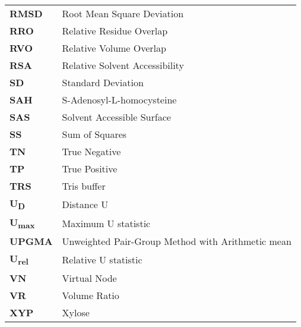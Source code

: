 \begin{longtable}[l]{@{}p{2.5cm}p{12cm}@{}}
\textbf{RMSD} & Root Mean Square Deviation \\
\textbf{RRO} & Relative Residue Overlap \\
\textbf{RVO} & Relative Volume Overlap \\
\textbf{RSA} & Relative Solvent Accessibility \\
\textbf{SD} & Standard Deviation \\
\textbf{SAH} & S-Adenosyl-L-homocysteine \\
\textbf{SAS} & Solvent Accessible Surface \\
\textbf{SS} & Sum of Squares \\
\textbf{TN} & True Negative \\
\textbf{TP} & True Positive \\
\textbf{TRS} & Tris buffer \\
\textbf{U\textsubscript{D}} & Distance U \\
\textbf{U\textsubscript{max}} & Maximum U statistic \\
\textbf{UPGMA} & Unweighted Pair-Group Method with Arithmetic mean \\
\textbf{U\textsubscript{rel}} & Relative U statistic \\
\textbf{VN} & Virtual Node \\
\textbf{VR} & Volume Ratio \\
\textbf{XYP} & Xylose \\

\end{longtable}
